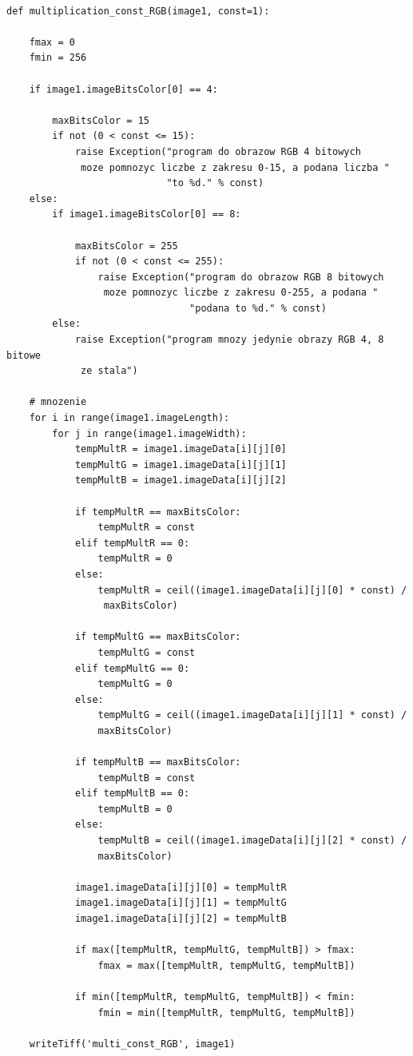 \documentclass[magisterska,openany]{pracadypl}
\begin{document}
\lstset{language=Python}
\vspace{0.25cm}
\begin{lstlisting}[caption={Mnożenie obrazu przez zadaną liczbę}]

def multiplication_const_RGB(image1, const=1):

    fmax = 0
    fmin = 256

    if image1.imageBitsColor[0] == 4:

        maxBitsColor = 15
        if not (0 < const <= 15):
            raise Exception("program do obrazow RGB 4 bitowych
             moze pomnozyc liczbe z zakresu 0-15, a podana liczba "
                            "to %d." % const)
    else:
        if image1.imageBitsColor[0] == 8:

            maxBitsColor = 255
            if not (0 < const <= 255):
                raise Exception("program do obrazow RGB 8 bitowych
                 moze pomnozyc liczbe z zakresu 0-255, a podana "
                                "podana to %d." % const)
        else:
            raise Exception("program mnozy jedynie obrazy RGB 4, 8 bitowe
             ze stala")

    # mnozenie
    for i in range(image1.imageLength):
        for j in range(image1.imageWidth):
            tempMultR = image1.imageData[i][j][0]
            tempMultG = image1.imageData[i][j][1]
            tempMultB = image1.imageData[i][j][2]

            if tempMultR == maxBitsColor:
                tempMultR = const
            elif tempMultR == 0:
                tempMultR = 0
            else:
                tempMultR = ceil((image1.imageData[i][j][0] * const) /
                 maxBitsColor)

            if tempMultG == maxBitsColor:
                tempMultG = const
            elif tempMultG == 0:
                tempMultG = 0
            else:
                tempMultG = ceil((image1.imageData[i][j][1] * const) / 
                maxBitsColor)

            if tempMultB == maxBitsColor:
                tempMultB = const
            elif tempMultB == 0:
                tempMultB = 0
            else:
                tempMultB = ceil((image1.imageData[i][j][2] * const) / 
                maxBitsColor)

            image1.imageData[i][j][0] = tempMultR
            image1.imageData[i][j][1] = tempMultG
            image1.imageData[i][j][2] = tempMultB

            if max([tempMultR, tempMultG, tempMultB]) > fmax:
                fmax = max([tempMultR, tempMultG, tempMultB])

            if min([tempMultR, tempMultG, tempMultB]) < fmin:
                fmin = min([tempMultR, tempMultG, tempMultB])

    writeTiff('multi_const_RGB', image1)


\end{lstlisting}
\newpage
\end{document}

